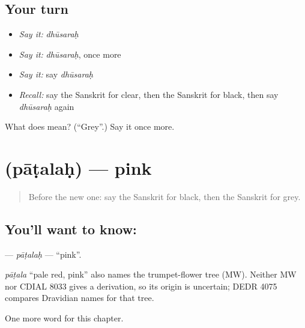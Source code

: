 \subsection*{Your turn}
\begin{itemize}
\raggedright
  \item \emph{Say it:} \emph{dhūsaraḥ}
  \item \emph{Say it:} \emph{dhūsaraḥ}, once more
  \item \emph{Say it:} say \emph{dhūsaraḥ}
  \item \emph{Recall:} say the Sanskrit for clear, then the Sanskrit for black, then say \emph{dhūsaraḥ} again
\end{itemize}

\begin{tcolorbox}[breakable,colback=teal!4,colframe=teal!35!black,title={Before you move on}]
What does  mean? (\textquotedblleft{}Grey\textquotedblright{}.) Say it once more.
\end{tcolorbox}
\section[\texorpdfstring{\sk{पाटलः} (pāṭalaḥ)}{पाटलः (pāṭalaḥ)}]{ (pāṭalaḥ) — pink}

\label{lesson:SA-C131-patalah}



\begin{quote}
Before the new one: say the Sanskrit for black, then the Sanskrit for grey.
\end{quote}

\subsection*{You'll want to know: }
\textbf{} — \emph{pāṭalaḥ} — \textquotedblleft{}pink\textquotedblright{}.

\begin{cousinweb}
\emph{pāṭala} \textquotedblleft{}pale red, pink\textquotedblright{} also names the trumpet-flower tree (MW). Neither MW nor CDIAL 8033 gives a derivation, so its origin is uncertain; DEDR 4075 compares Dravidian names for that tree.
\end{cousinweb}

\begin{grammarlens}[title={What you've built}]
One more word for this chapter.
\end{grammarlens}


